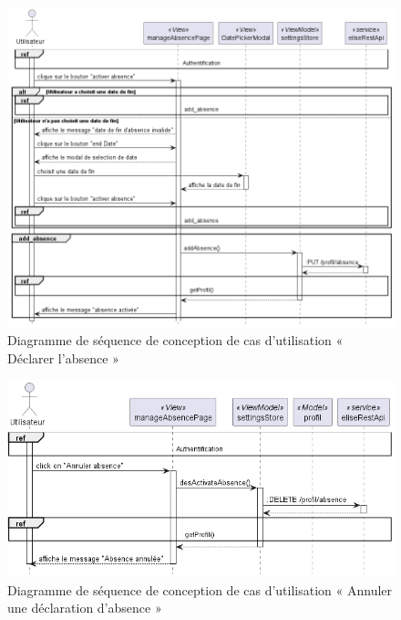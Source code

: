 \begin{figure}[H]
  \centering
  \includegraphics[width=1\textwidth]{out/diagrams/sprint6/sequence_declare_absence/sequence_declare_absence}
  \caption{Diagramme de séquence de conception de cas d'utilisation «  Déclarer l'absence »}
  \label{fig:conception_sequence_declare_absence}
\end{figure}

\begin{figure}[H]
  \centering
  \includegraphics[width=1\textwidth]{out/diagrams/sprint6/sequence_annuler_absence/sequence_annuler_absence}
  \caption{Diagramme de séquence de conception de cas d'utilisation « Annuler une déclaration d'absence »}
  \label{fig:conception_sequence_annuler_absence}
\end{figure}

